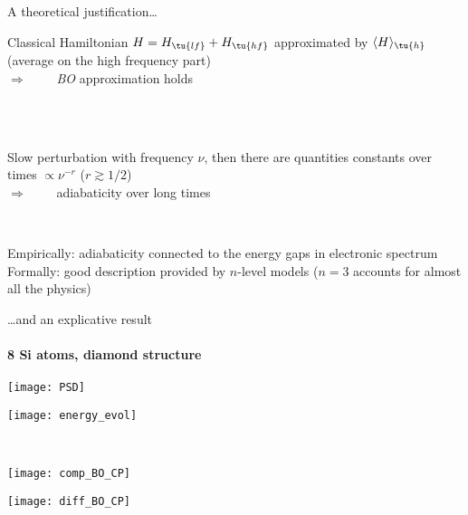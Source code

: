 \begin{frame}{A theoretical justification\ldots}%
	\\[3ex]
		\hspace*{.2\textwidth}
		\begin{minipage}[r]{.8\textwidth}
			Classical Hamiltonian $H = H_\tu{lf} + H_\tu{hf}$ approximated by $\langle H \rangle_\tu{h}$\\
			(average on the high frequency part)\\
			$\Rightarrow \qquad$ \emph{BO} approximation holds
		\end{minipage}\\[4ex]

	\\[3ex]
		\hspace*{.2\textwidth}
		\begin{minipage}[r]{.8\textwidth}
			Slow perturbation with frequency $\nu$, then there are quantities constants over times $\propto \nu^{-r}$ ($r \gtrsim 1/2$)\\
			$\Rightarrow \qquad$ adiabaticity over long times
		\end{minipage}\\[4ex]
	
	\begin{center}
		\alert{Empirically}: adiabaticity connected to the \alert{energy gaps in electronic spectrum}\\
		\alert{Formally}: good description provided by \alert{$n$-level models} ($n = 3$ accounts for almost all the physics)
	\end{center}
\end{frame}

\begin{frame}{\ldots and an explicative result}\framesubtitle{8 Si atoms, diamond structure}
	\begin{minipage}[c]{0.45\textwidth}
		\centering
		\texttt{[image: PSD]}
	\end{minipage}
	\hspace*{.05\textwidth}
	\begin{minipage}[c]{0.45\textwidth}
		\centering
		\texttt{[image: energy\_evol]}
	\end{minipage}\\
	\begin{minipage}[c]{0.45\textwidth}
		\centering
		\texttt{[image: comp\_BO\_CP]}
	\end{minipage}
	\hspace*{.05\textwidth}
	\begin{minipage}[c]{0.45\textwidth}
		\centering
		\texttt{[image: diff\_BO\_CP]}
	\end{minipage}
\end{frame}


